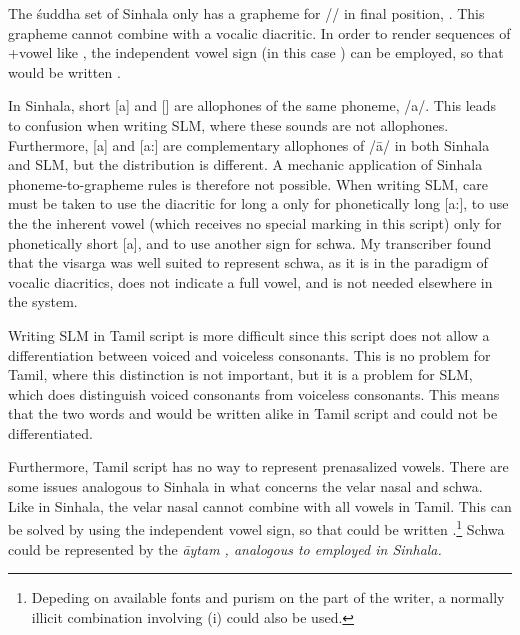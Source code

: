 The \'suddha set of Sinhala only has a grapheme for /\ng/ in final position, \graphem{\binduva}. This grapheme cannot combine with a vocalic diacritic. In order to render sequences of \ng +vowel like , the independent vowel sign (in this case \graphem{\SinhI}) can be employed, so that  would be written .


In Sinhala, short [a] and [\E] are allophones of the same phoneme, /a/. This leads to confusion when writing SLM, where these sounds are not allophones. Furthermore, [a] and [a:] are complementary allophones of /\=a/ in both Sinhala and SLM, but the distribution is different. A mechanic application of Sinhala phoneme-to-grapheme rules is therefore not possible.  When writing SLM, care must be taken to use the diacritic for long a  only for phonetically long [a:], to use the the inherent vowel (which receives no special marking in this script) only for phonetically short [a], and to use another sign for schwa. My transcriber found that the visarga \graphem{\visarga{}} was well suited to represent schwa, as it is in the paradigm of vocalic diacritics, does not indicate a full vowel, and is not needed elsewhere in the system.

Writing SLM in Tamil script is more difficult since this script does not allow a differentiation between voiced and voiceless consonants. This is no problem for Tamil, where this distinction is not important, but it is a problem for SLM, which does distinguish voiced consonants from voiceless consonants. This means that the two words   and  would be written alike in Tamil script \graphem{{\btam \TAMkaa\TAMka\etam }} and could not be differentiated.

Furthermore, Tamil script has no way to represent prenasalized vowels. There are some issues analogous to Sinhala in what concerns the velar nasal and schwa. Like in Sinhala, the velar nasal cannot combine with all vowels in Tamil. This can be solved by using the independent vowel sign, so that  could be written \graphem{{\btam \TAMaa\TAMng\TAMi\TAMng\etam }}.\footnote{Depeding on available fonts and purism on the part of the writer, a normally illicit combination involving \graphem{{\btam \TAMngi\etam }} (\ng i) could also be used.} Schwa could be represented by the \em \=aytam \em \graphem{$\therefore$}, analogous to \graphem{\visarga{}} employed in Sinhala.


